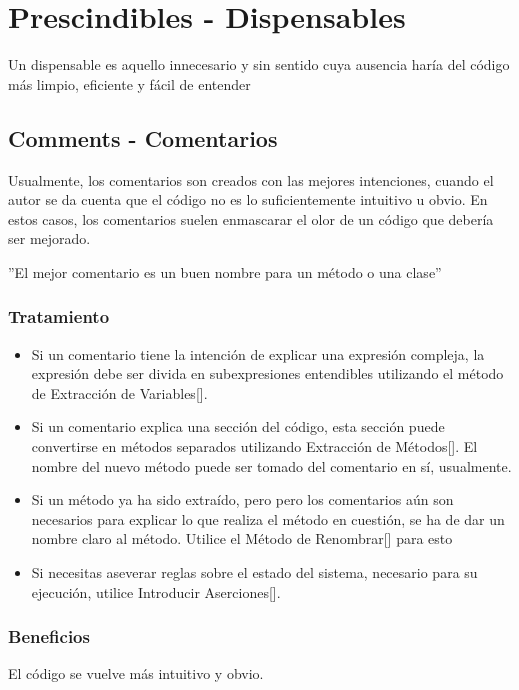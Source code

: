 \documentclass[11pt,a4paper,oneside]{book}
\begin{document}
\section{Prescindibles - Dispensables}


Un dispensable es aquello innecesario y sin sentido cuya ausencia haría del código más limpio, eficiente y fácil de entender

\subsection{Comments - Comentarios}
\label{comments}
Usualmente, los comentarios son creados con las mejores intenciones, cuando el autor se da cuenta que el código no es lo suficientemente intuitivo u obvio. En estos casos, los comentarios suelen enmascarar el olor de un código que debería ser mejorado.

{\centering''El mejor comentario es un buen nombre para un método o una clase''\par}
\subsubsection{Tratamiento}
\begin{itemize}
    \item Si un comentario tiene la intención de explicar una expresión compleja, la expresión debe ser divida en subexpresiones entendibles utilizando el método de Extracción de Variables[\pageref{extracvariable}].
    \item Si un comentario explica una sección del código, esta sección puede convertirse en métodos separados utilizando Extracción de Métodos[\pageref{extractmethod}]. El nombre del nuevo método puede ser tomado del comentario en sí, usualmente.
    \item Si un método ya ha sido extraído, pero pero los comentarios aún son necesarios para explicar lo que realiza el método en cuestión, se ha de dar un nombre claro al método. Utilice el Método de Renombrar[\pageref{renombrarmetodo}] para esto
    \item Si necesitas aseverar reglas sobre el estado del sistema, necesario para su ejecución, utilice Introducir Aserciones[\pageref{}].
\end{itemize}
\subsubsection{Beneficios}
El código se vuelve más intuitivo y obvio.
\end{document}
